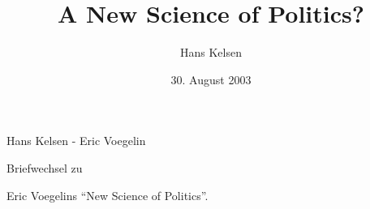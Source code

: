 \documentclass[10pt,a4paper,ngerman]{book}
\begin{document}
\selectlanguage{\ngerman}

\title{A New Science of Politics?}
\author{Hans Kelsen}

\date{30. August 2003}


\begin{titlepage}

\setlength{\parindent}{0em}


\begin{sf}

\setlength{\parskip}{7cm}

{\Huge Hans Kelsen - Eric Voegelin}

\setlength{\parskip}{3cm}

{\huge Briefwechsel zu }

\setlength{\parskip}{0.2cm}

{\huge Eric Voegelins "`New Science of Politics"'.}



\setlength{\parskip}{5cm}

\end{sf}

\end{titlepage}

\tableofcontents

\setcounter{page}{1}

%
%

%
\end{document}
